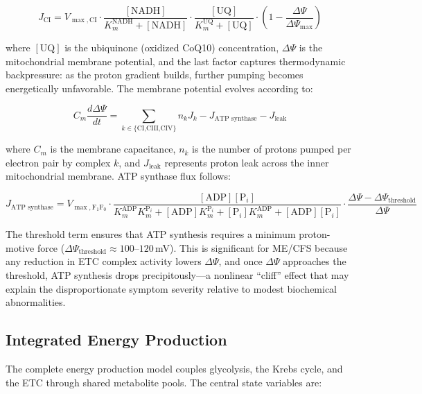 \begin{equation}
\label{eq:complex-i}
J_{\text{CI}} = V_{\max,\text{CI}} \cdot \frac{[\text{NADH}]}{K_m^{\text{NADH}} + [\text{NADH}]} \cdot \frac{[\text{UQ}]}{K_m^{\text{UQ}} + [\text{UQ}]} \cdot \left(1 - \frac{\Delta\Psi}{\Delta\Psi_{\max}}\right)
\end{equation}

where $[\text{UQ}]$ is the ubiquinone (oxidized CoQ10) concentration, $\Delta\Psi$ is the mitochondrial membrane potential, and the last factor captures thermodynamic backpressure: as the proton gradient builds, further pumping becomes energetically unfavorable. The membrane potential evolves according to:

\begin{equation}
\label{eq:membrane-potential}
C_m \frac{d\Delta\Psi}{dt} = \sum_{k \in \{\text{CI,CIII,CIV}\}} n_k J_k - J_{\text{ATP synthase}} - J_{\text{leak}}
\end{equation}

where $C_m$ is the membrane capacitance, $n_k$ is the number of protons pumped per electron pair by complex $k$, and $J_{\text{leak}}$ represents proton leak across the inner mitochondrial membrane. ATP synthase flux follows:

\begin{equation}
\label{eq:atp-synthase}
J_{\text{ATP synthase}} = V_{\max,\text{F}_1\text{F}_0} \cdot \frac{[\text{ADP}][\text{P}_i]}{K_m^{\text{ADP}} K_m^{\text{P}_i} + [\text{ADP}] K_m^{\text{P}_i} + [\text{P}_i] K_m^{\text{ADP}} + [\text{ADP}][\text{P}_i]} \cdot \frac{\Delta\Psi - \Delta\Psi_{\text{threshold}}}{\Delta\Psi}
\end{equation}

The threshold term ensures that ATP synthesis requires a minimum proton-motive force ($\Delta\Psi_{\text{threshold}} \approx 100$--$120$\,mV). This is significant for ME/CFS because any reduction in ETC complex activity lowers $\Delta\Psi$, and once $\Delta\Psi$ approaches the threshold, ATP synthesis drops precipitously---a nonlinear ``cliff'' effect that may explain the disproportionate symptom severity relative to modest biochemical abnormalities.

\subsection{Integrated Energy Production}
\label{sec:integrated-energy}

The complete energy production model couples glycolysis, the Krebs cycle, and the ETC through shared metabolite pools. The central state variables are:

